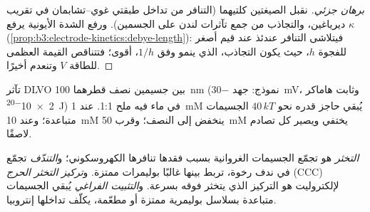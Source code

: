 \begin{proof}[برهان جزئي]
نقبل الصيغتين كلتيهما (التنافر من تداخل طبقتي غوي--تشابمان
في تقريب ديرياغين، والتجاذب من جمع تآثرات لندن
على الجسمين). ورفع الشدة الأيونية يرفع $\kappa$
(\cref{prop:b3:electrode-kinetics:debye-length}): فيتلاشى التنافر عندئذ عند
قيم أصغر للفجوة $h$، حيث يكون التجاذب، الذي ينمو وفق $1/h$، أقوى؛ فتتناقص القيمة العظمى
للطاقة $V$ وتنعدم أخيرًا.
\end{proof}

\begin{omfigure}

{\small تآثر DLVO بين جسيمين نصف قطرهما \qty{100}{nm} (نموذج: جهد 
\qty{-30}{mV}، وثابت هاماكر \qty{2e-20}{J}) في ماء فيه ملح 1:1. عند \qty{1}{mM}
يُبقي حاجز قدره نحو $40\,kT$ الجسيمات متباعدة؛ وعند \qty{10}{mM} ينخفض إلى النصف؛
وقرب \qty{50}{mM} يختفي ويصير كل تصادم لاصقًا.}
\end{omfigure}

\begin{definition}\label{def:b3:colloids:stability}
\emph{التخثر} هو تجمّع الجسيمات الغروانية
بسبب فقدها تنافرها الكهروسكوني؛ و\emph{التندّف}
تجمّع في ندف رخوة، تربط بينها غالبًا بوليمرات ممتزة. 
و\emph{تركيز التخثر الحرج}
(CCC) لإلكتروليت هو التركيز الذي يتخثر فوقه
 بسرعة. و\emph{التثبيت الفراغي}
يُبقي الجسيمات متباعدة بسلاسل بوليمرية ممتزة أو مطعّمة،
يكلّف تداخلها إنتروبيا.
\end{definition}

